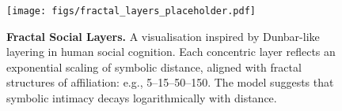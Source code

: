 \begin{figure}[H]
\centering
\texttt{[image: figs/fractal\_layers\_placeholder.pdf]}
\caption{\textbf{Fractal Social Layers.} A visualisation inspired by Dunbar-like layering in human social cognition. Each concentric layer reflects an exponential scaling of symbolic distance, aligned with fractal structures of affiliation: e.g., 5–15–50–150. The model suggests that symbolic intimacy decays logarithmically with distance.}
\end{figure}